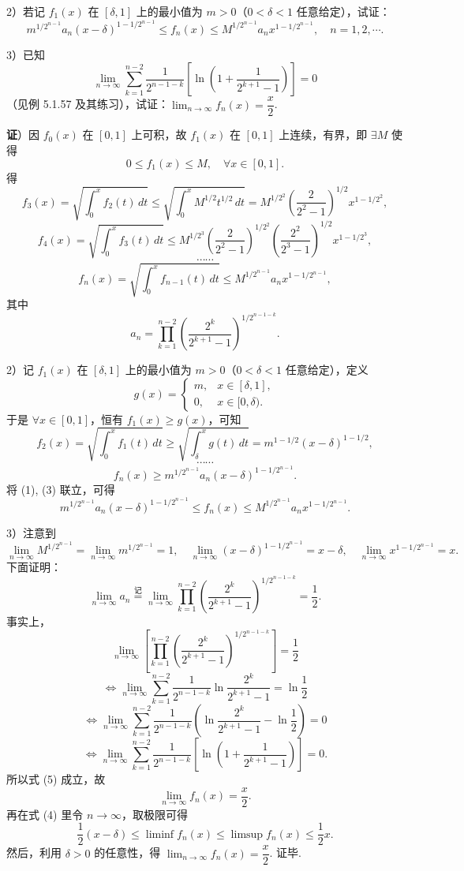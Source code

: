 \documentclass[UTF8,12pt,a4paper,fontset=fandol]{ctexart}
\begin{document}
2）若记 $f_1(x)$ 在 $[\delta,1]$ 上的最小值为 $m>0$（$0<\delta<1$ 任意给定），试证：
\[
m^{1/2^{n-1}}a_n(x-\delta)^{1-1/2^{n-1}}
\le f_n(x)\le
M^{1/2^{n-1}}a_nx^{1-1/2^{n-1}},\quad n=1,2,\cdots.
\]

3）已知
\[
\lim_{n\to\infty}\sum_{k=1}^{n-2}
\frac1{2^{n-1-k}}\left[\ln\left(1+\frac1{2^{k+1}-1}\right)\right]=0
\]
（见例 5.1.57 及其练习），试证：$\displaystyle\lim_{n\to\infty}f_n(x)=\dfrac x2$.

\noindent\textbf{证}）因 $f_0(x)$ 在 $[0,1]$ 上可积，故 $f_1(x)$ 在 $[0,1]$ 上连续，有界，即 $\exists M$ 使得
\[
0\le f_1(x)\le M,\quad \forall x\in[0,1].
\]
得
\[
f_3(x)=\sqrt{\int_0^x f_2(t)\,dt}
\le\sqrt{\int_0^x M^{1/2}t^{1/2}\,dt}
=M^{1/2^2}\left(\frac{2}{2^2-1}\right)^{1/2}x^{1-1/2^2},
\]
\[
f_4(x)=\sqrt{\int_0^x f_3(t)\,dt}
\le M^{1/2^3}
\left(\frac{2}{2^2-1}\right)^{1/2^2}
\left(\frac{2^2}{2^3-1}\right)^{1/2}
x^{1-1/2^3},
\]
\[
\cdots\cdots
\]
\[
f_n(x)=\sqrt{\int_0^x f_{n-1}(t)\,dt}
\le M^{1/2^{n-1}}a_nx^{1-1/2^{n-1}},
\tag{1}
\]
其中
\[
a_n=\prod_{k=1}^{n-2}
\left(\frac{2^k}{2^{k+1}-1}\right)^{1/2^{n-1-k}}.
\tag{2}
\]

2）记 $f_1(x)$ 在 $[\delta,1]$ 上的最小值为 $m>0$（$0<\delta<1$ 任意给定），定义
\[
g(x)=
\begin{cases}
m, & x\in[\delta,1],\\
0, & x\in[0,\delta).
\end{cases}
\]
于是 $\forall x\in[0,1]$，恒有 $f_1(x)\ge g(x)$，可知
\[
f_2(x)=\sqrt{\int_0^x f_1(t)\,dt}
\ge\sqrt{\int_\delta^xg(t)\,dt}
=m^{1-1/2}(x-\delta)^{1-1/2},
\]
\[
\cdots\cdots
\]
\[
f_n(x)\ge m^{1/2^{n-1}}a_n(x-\delta)^{1-1/2^{n-1}}.
\tag{3}
\]
将 (1), (3) 联立，可得
\[
m^{1/2^{n-1}}a_n(x-\delta)^{1-1/2^{n-1}}
\le f_n(x)\le
M^{1/2^{n-1}}a_nx^{1-1/2^{n-1}}.
\tag{4}
\]

3）注意到
\[
\lim_{n\to\infty}M^{1/2^{n-1}}
=\lim_{n\to\infty}m^{1/2^{n-1}}=1,
\quad
\lim_{n\to\infty}(x-\delta)^{1-1/2^{n-1}}=x-\delta,\quad
\lim_{n\to\infty}x^{1-1/2^{n-1}}=x.
\]
下面证明：
\[
\lim_{n\to\infty}a_n
\stackrel{\text{记}}{=}
\lim_{n\to\infty}\prod_{k=1}^{n-2}
\left(\frac{2^k}{2^{k+1}-1}\right)^{1/2^{n-1-k}}
=\frac12.
\tag{5}
\]
事实上，
\[
\lim_{n\to\infty}\left[
\prod_{k=1}^{n-2}
\left(\frac{2^k}{2^{k+1}-1}\right)^{1/2^{n-1-k}}
\right]=\frac12
\]
\[
\Longleftrightarrow
\lim_{n\to\infty}\sum_{k=1}^{n-2}
\frac1{2^{n-1-k}}\ln\frac{2^k}{2^{k+1}-1}
=\ln\frac12
\]
\[
\Longleftrightarrow
\lim_{n\to\infty}\sum_{k=1}^{n-2}
\frac1{2^{n-1-k}}\left(\ln\frac{2^k}{2^{k+1}-1}-\ln\frac12\right)=0
\]
\[
\Longleftrightarrow
\lim_{n\to\infty}\sum_{k=1}^{n-2}
\frac1{2^{n-1-k}}\left[
\ln\left(1+\frac1{2^{k+1}-1}\right)\right]=0.
\]
所以式 (5) 成立，故
\[
\lim_{n\to\infty}f_n(x)=\frac x2.
\]
再在式 (4) 里令 $n\to\infty$，取极限可得
\[
\frac12(x-\delta)\le\liminf f_n(x)\le\limsup f_n(x)\le\frac12x.
\]
然后，利用 $\delta>0$ 的任意性，得 $\displaystyle\lim_{n\to\infty}f_n(x)=\dfrac x2$. 证毕.
\end{document}
